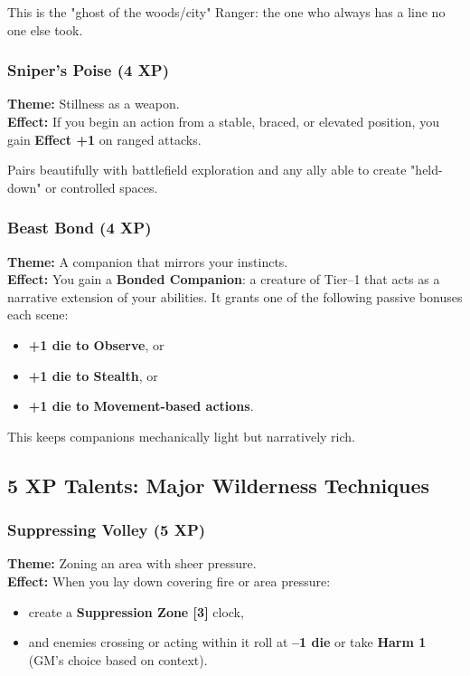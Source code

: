 \documentclass[11pt]{book}
\begin{document}
This is the "ghost of the woods/city" Ranger:
the one who always has a line no one else took.

\subsubsection{Sniper's Poise (4 XP)}
\textbf{Theme:} Stillness as a weapon.\\
\textbf{Effect:} If you begin an action from a stable, braced, or elevated position,
you gain \textbf{Effect +1} on ranged attacks.

Pairs beautifully with battlefield exploration
and any ally able to create "held-down" or controlled spaces.

\subsubsection{Beast Bond (4 XP)}
\textbf{Theme:} A companion that mirrors your instincts.\\
\textbf{Effect:} You gain a \textbf{Bonded Companion}:
a creature of Tier--1 that acts as a narrative extension of your abilities.
It grants one of the following passive bonuses each scene:
\begin{itemize}
  \item \textbf{+1 die to Observe}, or
  \item \textbf{+1 die to Stealth}, or
  \item \textbf{+1 die to Movement-based actions}.
\end{itemize}

This keeps companions mechanically light but narratively rich.

\subsection{5 XP Talents: Major Wilderness Techniques}

\subsubsection{Suppressing Volley (5 XP)}
\textbf{Theme:} Zoning an area with sheer pressure.\\
\textbf{Effect:} When you lay down covering fire or area pressure:
\begin{itemize}
  \item create a \textbf{Suppression Zone [3]} clock,
  \item and enemies crossing or acting within it roll at \textbf{--1 die}
        or take \textbf{Harm 1} (GM's choice based on context).
\end{itemize}
\end{document}
